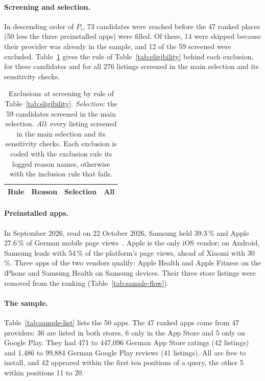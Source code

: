 \paragraph{Screening and selection.} In descending order of $P_i$, 73 candidates were reached
before the 47 ranked places (50 less the three preinstalled apps) were filled. Of these, 14 were
skipped because their provider was already in the sample, and 12 of the 59 screened were excluded.
Table~\ref{tab:screening-rules} gives the rule of Table~\ref{tab:eligibility} behind each
exclusion, for these candidates and for all 276 listings screened in the main selection and its
sensitivity checks.

\begin{table}[H]
\centering
\begin{singlespace}
\caption[Exclusions at screening by rule]{Exclusions at screening by rule of
Table~\ref{tab:eligibility}. \emph{Selection}: the 59 candidates screened in the main selection.
\emph{All}: every listing screened in the main selection and its sensitivity checks. Each
exclusion is coded with the exclusion rule its logged reason names, otherwise with the inclusion
rule that fails.}
\label{tab:screening-rules}
\small
\begin{tabularx}{\textwidth}{@{}l>{\raggedright\arraybackslash}Xrr@{}}
\toprule
\textbf{Rule} & \textbf{Reason} & \textbf{Selection} & \textbf{All} \\
\midrule
\end{tabularx}
\end{singlespace}
\end{table}

\paragraph{Preinstalled apps.} In September 2026, read on 22 October 2026, Samsung held
39.3\,\% and Apple 27.6\,\% of German mobile page views~\parencite{statcounter2026vendor}. Apple
is the only iOS vendor; on Android, Samsung leads with 54\,\% of the platform's page views, ahead
of Xiaomi with 30\,\%. Three apps of the two vendors qualify: Apple Health and Apple Fitness on the
iPhone and Samsung Health on Samsung devices. Their three store listings were removed from the
ranking (Table~\ref{tab:sample-flow}).

\paragraph{The sample.} Table~\ref{tab:sample-list} lists the 50 apps. The 47 ranked apps come from
47 providers: 36 are listed in both stores, 6 only in the App Store and 5 only on Google Play.
They had 471 to 447{,}096 German App Store ratings (42 listings) and 1{,}486 to 99{,}884 German
Google Play reviews (41 listings). All are free to install, and 42 appeared within the first ten
positions of a query, the other 5 within positions 11 to 20.

